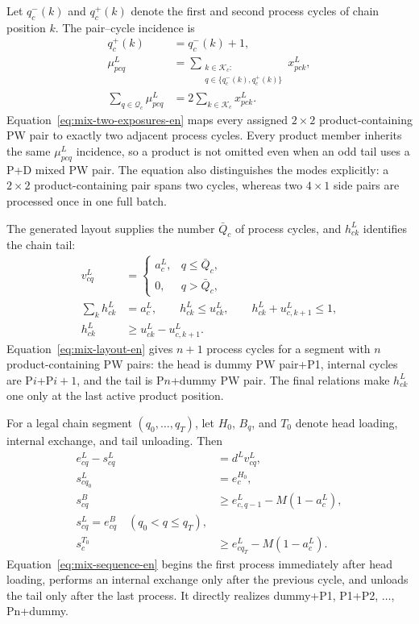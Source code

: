 \documentclass[journal]{IEEEtran}
\begin{document}
Let $q_c^-(k)$ and $q_c^+(k)$ denote the first and second process cycles of chain position $k$. The pair--cycle incidence is
\begin{equation}
\begin{aligned}
q_c^+(k)&=q_c^-(k)+1,\\
\mu^L_{pcq}
&=\sum_{\substack{k\in\mathcal K_c:\\q\in\{q_c^-(k),q_c^+(k)\}}}x^L_{pck},\\
\sum_{q\in\mathcal Q_c}\mu^L_{pcq}
&=2\sum_{k\in\mathcal K_c}x^L_{pck}.
\end{aligned}
\label{eq:mix-two-exposures-en}
\end{equation}
Equation~\eqref{eq:mix-two-exposures-en} maps every assigned $2\times2$ product-containing PW pair to exactly two adjacent process cycles. Every product member inherits the same $\mu^L_{pcq}$ incidence, so a product is not omitted even when an odd tail uses a P+D mixed PW pair. The equation also distinguishes the modes explicitly: a $2\times2$ product-containing pair spans two cycles, whereas two $4\times1$ side pairs are processed once in one full batch.

The generated layout supplies the number $\bar Q_c$ of process cycles, and $h^L_{ck}$ identifies the chain tail:
\begin{equation}
\begin{aligned}
v^L_{cq}&=
\begin{cases}a^L_c,&q\le\bar Q_c,\\0,&q>\bar Q_c,
\end{cases}\\
\sum_k h^L_{ck}&=a^L_c,\qquad
h^L_{ck}\le u^L_{ck},\qquad
h^L_{ck}+u^L_{c,k+1}\le1,\\
h^L_{ck}&\ge u^L_{ck}-u^L_{c,k+1}.
\end{aligned}
\label{eq:mix-layout-en}
\end{equation}
Equation~\eqref{eq:mix-layout-en} gives $n+1$ process cycles for a segment with $n$ product-containing PW pairs: the head is dummy PW pair+P1, internal cycles are P$i$+P$i+1$, and the tail is P$n$+dummy PW pair. The final relations make $h^L_{ck}$ one only at the last active product position.

For a legal chain segment $(q_0,\ldots,q_T)$, let $H_0$, $B_q$, and $T_0$ denote head loading, internal exchange, and tail unloading. Then
\begin{equation}
\begin{aligned}
e^L_{cq}-s^L_{cq}&=d^L v^L_{cq},\\
s^L_{cq_0}&=e^{H_0}_c,\\
s^{B}_{cq}&\ge e^L_{c,q-1}-M(1-a^L_c),\\
s^L_{cq}=e^{B}_{cq}\quad(q_0<q\le q_T),\\
s^{T_0}_c&\ge e^L_{cq_T}-M(1-a^L_c).
\end{aligned}
\label{eq:mix-sequence-en}
\end{equation}
Equation~\eqref{eq:mix-sequence-en} begins the first process immediately after head loading, performs an internal exchange only after the previous cycle, and unloads the tail only after the last process. It directly realizes dummy+P1, P1+P2, $\ldots$, Pn+dummy.
\end{document}
